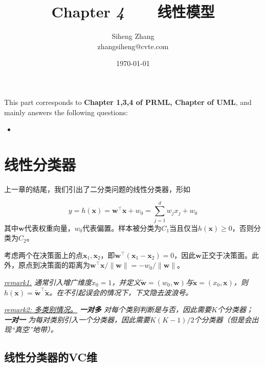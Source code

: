 \documentclass{article}
\author{Siheng Zhang\\zhangsiheng@cvte.com}
\title{Chapter \textbf{\textit{4}}\ \ \ \ 线性模型}
\date{\today}
\begin{document}
\maketitle  

This part corresponds to \textbf{Chapter 1,3,4 of PRML, Chapter of UML}, and mainly answers the following questions:

\begin{itemize}
\item 
\end{itemize}

\tableofcontents
\newpage

\section{线性分类器}

	上一章的结尾，我们引出了二分类问题的线性分类器，形如
	
	\begin{equation}
	y=h(\mathbf{x})=\mathbf{w}^\top \mathbf{x} + w_0 = \sum_{j=1}^d w_j x_j + w_0
	\label{eq:linear}
	\end{equation}
其中$\mathbf{w}$代表权重向量，$w_0$代表偏置。样本被分类为$C_1$当且仅当$h(\mathbf{x})\geq 0$，否则分类为$C_2$。

	考虑两个在决策面上的点$\mathbf{x}_1,\mathbf{x}_2$，即$\mathbf{w}^\top (\mathbf{x}_1 - \mathbf{x}_2) = 0$，因此$\mathbf{w}$正交于决策面。此外，原点到决策面的距离为$\mathbf{w}^\top \mathbf{x} / \|\mathbf{w}\|=-w_0/\|\mathbf{w}\|$。
	
	\vspace{2mm}
	\begin{scriptsize}
	\begin{spacing}{1.2}
	{\sffamily
	\noindent\textit{\underline{remark1.} 通常引入增广维度$x_0 = 1$，并定义$\tilde{\mathbf{w}} = (w_0, \mathbf{w})$与$\tilde{\mathbf{x}} = (x_0, \mathbf{x})$，则$h(\mathbf{x}) = \tilde{\mathbf{w}}^\top \tilde{\mathbf{x}}$。在不引起误会的情况下，下文隐去波浪号。}
	
	\noindent\textit{\underline{remark2: 多类别情况。}  \textbf{一对多} 对每个类别判断是与否，因此需要$K$个分类器；  \textbf{一对一} 为每对类别引入一个分类器，因此需要$K(K-1)/2$个分类器（但是会出现“真空”地带）。}}
	\end{spacing}
	\end{scriptsize}
	\vspace{-2mm}
	
	\subsection{线性分类器的VC维}
	
\end{document}
